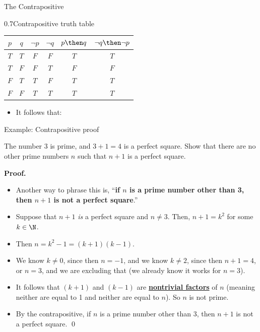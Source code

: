 \documentclass[12pt,aspectratio=1610, handout]{beamer}
\begin{document}
\begin{frame}{The Contrapositive}
\begin{center}
\begin{blockz}{0.7}{Contrapositive truth table}	
			\begin{tabular}{|c|c|c|c|c|c|}
				\hline
				$p$ & $q$ & $\neg p$ & $\neg q$ & $p \then q$ & $\neg q \then \neg p$\\ 
				\hline
				$T$ & $T$ & $F$ & $F$ & $T$ & $T$ \\
				\hline
				$T$ & $F$ & $F$ &$T$ &$F$ &$F$\\
				\hline
				$F$ & $T$ & $T$& $F$ &$T$ &$T$\\
				\hline
				$F$ & $F$ & $T$&$T$ &$T$ &$T$\\
				\hline
			\end{tabular}
		\end{blockz}
\end{center}\p
	\begin{itemize}
		\item[\finger] It follows that: \\
		\begin{center}
		\end{center}
	\end{itemize}
\end{frame}

\begin{frame}{Example: Contrapositive proof}
	\begin{examplen}
		The number 3 is prime, and $3+1 = 4$ is a perfect square. Show that there are no other prime numbers $n$ such that $n+1$ is a perfect square. \p
	\end{examplen}
	\vspace{0mm}
	\textbf{Proof.}
	\begin{itemize}
		\item Another way to phrase this is, ``\textbf{if $n$ is a prime number other than 3, then $n+1$ is not a perfect square}.''\p
		\item Suppose that $n+1$ \emph{is} a perfect square and $n \neq 3$. Then, $n+1= k^2$ for some $k \in \N$. \p
		\item Then $n = k^2 - 1 = (k+1)(k-1)$. \p
		\item We know $k \neq 0$, since then $n = -1$, and we know $k \neq 2$, since then $n+1 = 4$, or $n=3$, and we are excluding that (we already know it works for $n=3$). \p
		\item It follows that $(k+1)$ and $(k-1)$ are \textbf{\href{https://math.answers.com/natural-sciences/What_are_non-trivial_factors}{nontrivial factors}} of $n$ (meaning neither are equal to 1 and neither are equal to $n$). So $n$ is not prime.\p
		\item By the contrapositive, if $n$ is a prime number other than $3$, then $n+1$ is not a perfect square. \p \qed
	\end{itemize}
\end{frame}
\end{document}
